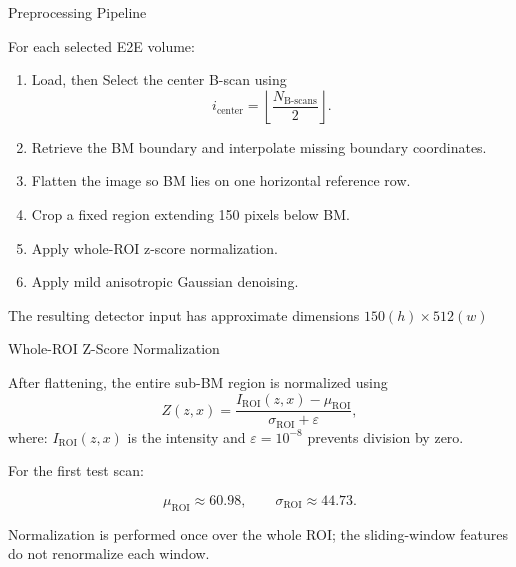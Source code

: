 \documentclass[aspectratio=169]{beamer}
\begin{document}
\begin{frame}{Preprocessing Pipeline}

For each selected E2E volume:

\begin{enumerate}
    \item Load, then Select the center B-scan using
    \[
    i_{\mathrm{center}}
    =
    \left\lfloor
    \frac{N_{\mathrm{B\text{-}scans}}}{2}
    \right\rfloor.
    \]
    \item Retrieve the BM boundary and interpolate missing boundary coordinates.
    \item Flatten the image so BM lies on one horizontal reference row.
    \item Crop a fixed region extending 150 pixels below BM.
    \item Apply whole-ROI z-score normalization.
    \item Apply mild anisotropic Gaussian denoising.
\end{enumerate}

\vspace{0.2cm}

The resulting detector input has approximate dimensions $150(h) \times 512(w)$

\end{frame}

\begin{frame}{Whole-ROI Z-Score Normalization}

After flattening, the entire  sub-BM region is normalized using
\[
Z(z,x)
=
\frac{
I_{\mathrm{ROI}}(z,x)-\mu_{\mathrm{ROI}}
}{
\sigma_{\mathrm{ROI}}+\varepsilon
},
\]
where: \(I_{\mathrm{ROI}}(z,x)\) is the intensity and \(\varepsilon=10^{-8}\) prevents division by zero.

\vspace{0.3cm}

For the first test scan:

\[
\mu_{\mathrm{ROI}} \approx 60.98,
\qquad
\sigma_{\mathrm{ROI}} \approx 44.73.
\]

\vspace{0.3cm}

Normalization is performed once over the whole ROI; the sliding-window features
do not renormalize each window.

\end{frame}
\end{document}

